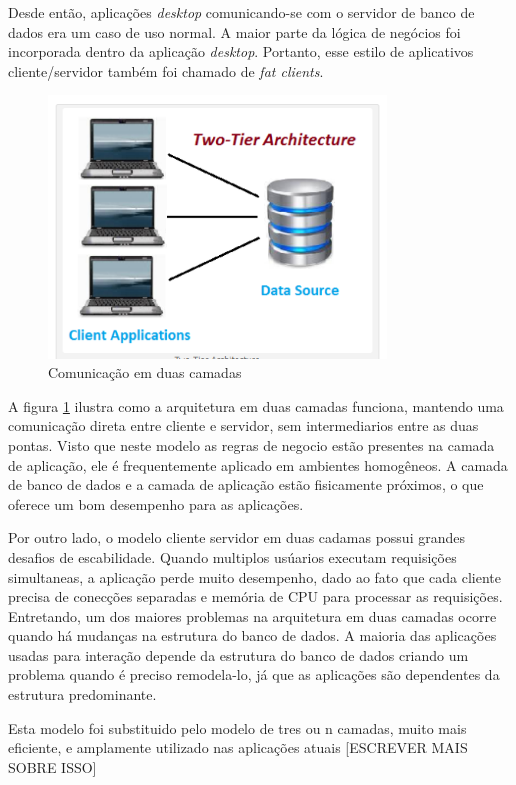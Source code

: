 Desde então, aplicações \textit{desktop} comunicando-se com o servidor de banco de dados era um caso de uso normal. A maior parte da lógica de negócios foi incorporada dentro da aplicação \textit{desktop}. Portanto, esse estilo de aplicativos cliente/servidor também foi chamado de \textit{fat clients}. 

\begin{figure}[ht]
    \centering
    \includegraphics[width=0.8\textwidth]{figuras/two-tier.png}
    \caption{Comunicação em duas camadas}
    \label{fig:two-tier}
\end{figure}

A figura \ref{fig:two-tier} ilustra como a arquitetura em duas camadas funciona, mantendo uma comunicação direta entre cliente e servidor, sem intermediarios entre as duas pontas. Visto que neste modelo as regras de negocio estão presentes na camada de aplicação, ele é frequentemente aplicado em ambientes homogêneos. A camada de banco de dados e a camada de aplicação estão fisicamente próximos, o que oferece um bom desempenho para as aplicações.

Por outro lado, o modelo cliente servidor em duas cadamas possui grandes desafios de escabilidade. Quando multiplos usúarios executam requisições simultaneas, a aplicação perde muito desempenho, dado ao fato que cada cliente precisa de conecções separadas e memória de CPU para processar as requisições. Entretando, um dos maiores problemas na arquitetura em duas camadas ocorre quando há mudanças na estrutura do banco de dados. A maioria das aplicações usadas para interação depende da estrutura do banco de dados criando um problema quando é preciso remodela-lo, já que as aplicações são dependentes da estrutura predominante.

Esta modelo foi substituido pelo modelo de tres ou n camadas, muito mais eficiente, e amplamente utilizado nas aplicações atuais [ESCREVER MAIS SOBRE ISSO]

